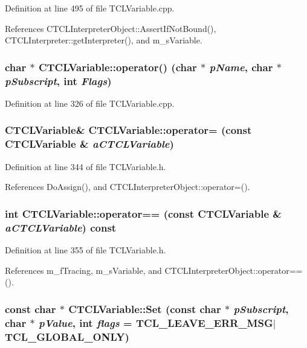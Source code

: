 Definition at line 495 of file TCLVariable.cpp.

References CTCLInterpreter\-Object::Assert\-If\-Not\-Bound(), CTCLInterpreter::get\-Interpreter(), and m\_\-s\-Variable.
\subsubsection{\setlength{\rightskip}{0pt plus 5cm}char $\ast$ CTCLVariable::operator() (char $\ast$ {\em p\-Name}, char $\ast$ {\em p\-Subscript}, int {\em Flags})\hspace{0.3cm}{\tt  [virtual]}}\label{classCTCLVariable_a9}




Definition at line 326 of file TCLVariable.cpp.
\subsubsection{\setlength{\rightskip}{0pt plus 5cm}CTCLVariable\& CTCLVariable::operator= (const CTCLVariable \& {\em a\-CTCLVariable})\hspace{0.3cm}{\tt  [inline]}}\label{classCTCLVariable_a4}




Definition at line 344 of file TCLVariable.h.

References Do\-Assign(), and CTCLInterpreter\-Object::operator=().
\subsubsection{\setlength{\rightskip}{0pt plus 5cm}int CTCLVariable::operator== (const CTCLVariable \& {\em a\-CTCLVariable}) const\hspace{0.3cm}{\tt  [inline]}}\label{classCTCLVariable_a5}




Definition at line 355 of file TCLVariable.h.

References m\_\-f\-Tracing, m\_\-s\-Variable, and CTCLInterpreter\-Object::operator==().
\subsubsection{\setlength{\rightskip}{0pt plus 5cm}const char $\ast$ CTCLVariable::Set (const char $\ast$ {\em p\-Subscript}, char $\ast$ {\em p\-Value}, int {\em flags} = TCL\_\-LEAVE\_\-ERR\_\-MSG$|$TCL\_\-GLOBAL\_\-ONLY)\hspace{0.3cm}{\tt  [virtual]}}\label{classCTCLVariable_a11}




